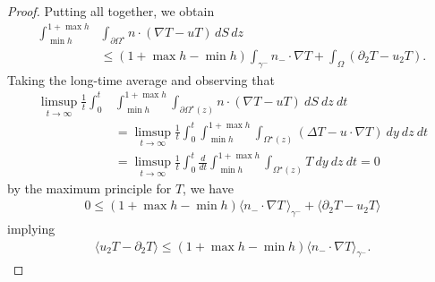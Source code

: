 \documentclass{article}
\theoremstyle{definition}
\theoremstyle{definition}
\newtheorem{remark}{Remark}[section]
\newcommand{\gplus}{\gamma^+}
\newcommand{\gminus}{\gamma^-}
\newcommand{\la}{\langle}
\newcommand{\ra}{\rangle}
\begin{document}
\begin{proof}
Putting all together, we obtain
\begin{align*}
    \int_{\min h}^{1+\max h}&\int_{\partial\Omega^{\star}}n\cdot (\nabla T-uT)\, dS\, dz
    \\
    &\leq (1+\max h - \min h)\int_{\gminus}n_-\cdot \nabla T+\int_{\Omega} (\partial_2T-u_2T).
\end{align*}
Taking the long-time average and observing that
\begin{align*}
    \limsup_{t\rightarrow \infty}\frac{1}{t}\int_0^t &\int_{\min h}^{1+\max h}\int_{\partial\Omega^{\star}(z)}n\cdot (\nabla T-uT)\ dS\ dz\ dt
    \\
    &=\limsup_{t\rightarrow \infty}\frac{1}{t}\int_0^t \int_{\min h}^{1+\max h}\int_{\Omega^{\star}(z)} (\Delta T-u\cdot \nabla T)\ dy\ dz\ dt
    \\
    &=\limsup_{t\rightarrow \infty}\frac{1}{t}\int_0^t\frac{d}{dt} \int_{\min h}^{1+\max h}\int_{\Omega^{\star}(z)} T \ dy\ dz\ dt %
    =0\,
\end{align*}
by the maximum principle for $T$, we have 
\begin{align*}
    0\leq (1+\max h-\min h)\la n_-\cdot \nabla T\, \ra_{\gminus}+\la\partial_2T-u_2T\ra
\end{align*}
implying
\begin{align*}
     \la u_2T-\partial_2T\ra\leq(1+\max h-\min h)\la n_-\cdot \nabla T\ra_{\gminus}.
\end{align*}
\end{proof}
\end{document}
